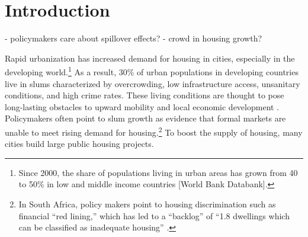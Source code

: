 \documentclass[12pt]{article}
\begin{document}
\begin{titlepage}
\begin{abstract}

\bigskip
\end{abstract}
\setcounter{page}{0}
\thispagestyle{empty}
\end{titlepage}
\pagebreak \newpage

\section{Introduction} \label{sec:introduction}





- policymakers care about spillover effects?
- crowd in housing growth?



Rapid urbanization has increased demand for housing in cities, especially in the developing world.\footnote{Since 2000, the share of populations living in urban areas has grown from 40 to 50\% in low and middle income countries [World Bank Databank].}  As a result, 30\% of urban populations in developing countries live in slums characterized by overcrowding, low infrastructure access, unsanitary conditions, and high crime rates. These living conditions are thought to pose long-lasting obstacles to upward mobility and local economic development \citep{marx2013slums}.  Policymakers often point to slum growth as evidence that formal markets are unable to meet rising demand for housing.\footnote{In South Africa, policy makers point to housing discrimination such as financial ``red lining,'' which has led to a ``backlog'' of ``1.8 dwellings which can be classified as inadequate housing'' \citep{bng}.}  To boost the supply of housing, many cities build large public housing projects. %
\end{document}
